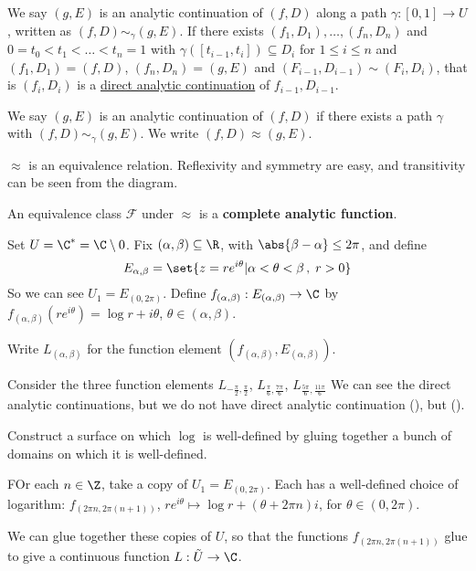 \documentclass{article}
\begin{document}
\begin{defi}
    We say $(g, E)$ is an analytic continuation of $(f, D)$ along a path $\gamma: [0, 1] \to U$, written as $(f, D) \sim_\gamma (g, E)$.  If there exists $(f_1, D_1), \dotsc, (f_n, D_n)$ and $0 = t_0 < t_1 < \dots < t_n = 1$ with $\gamma([t_{i-1}, t_i]) \subseteq D_i$ for $1 \leq i \leq n$ and $(f_1, D_1) = (f, D)$, $(f_n, D_n) = (g, E)$ and $(F_{i-1}, D_{i-1}) \sim (F_i, D_i)$, that is $(f_i, D_i)$ is a \hyperlink{def:directAnalCont}{direct analytic continuation} of $f_{i-1}, D_{i-1}$.
\end{defi}


\begin{defi}
    We say $(g, E)$ is an analytic continuation of $(f, D)$ if there exists a path $\gamma$ with $(f, D) \sim_\gamma (g, E)$.  We write $(f, D) \approx (g, E)$.
\end{defi}

\begin{remark}
    $\approx$ is an equivalence relation.  Reflexivity and symmetry are easy, and transitivity can be seen from the diagram.
\end{remark}


\begin{defi}
    An equivalence class $\mathcal{F}$ under $\approx$ is a \textbf{complete analytic function}.
\end{defi}

\begin{eg}
    Set $U = \C^* = \C \setminus {0}$.  Fix $(\alpha, \beta) \subseteq \R$, with $\abs{\beta-\alpha} \leq 2 \pi$, and define
    \begin{equation*}E_{\alpha, \beta} = \set{z = r e^{i \theta} | \alpha < \theta < \beta \, , \; r > 0}\end{equation*}
    So we can see $U_1 = E_(0, 2 \pi)$.
    Define $f_{(\alpha, \beta)} : E_{(\alpha, \beta)} \to \C$ by $f_{(\alpha, \beta)} (r e^{i \theta}) = \log r + i \theta$, $\theta \in (\alpha, \beta)$.

    Write $L_{(\alpha, \beta)}$ for the function element $(f_{(\alpha, \beta)}, E_{(\alpha, \beta)})$.

    Consider the three function elements $L_{-\frac\pi2, \frac\pi2}$, $L_{\frac\pi6, \frac{7\pi}6}$, $L_{\frac{5\pi}6, \frac{11\pi}{6}}$
    We can see the direct analytic continuations, but we do not have direct analytic continuation (), but ().
\end{eg}

\begin{goal}
    Construct a surface on which $\log$ is well-defined by gluing together a bunch of domains on which it is well-defined.
\end{goal}

FOr each $n \in \Z$, take a copy of $U_1 = E_{(0, 2\pi)}$.  Each has a well-defined choice of logarithm: $f_{(2\pi n, 2\pi (n+1))}$, $r e^{i \theta} \mapsto \log r + (\theta + 2 \pi n) i$, for $\theta \in (0, 2\pi)$.

We can glue together these copies of $U$, so that the functions $f_{(2\pi n, 2\pi (n+1))}$ glue to give a continuous function $L : \tilde{U} \to \C$.
\end{document}
